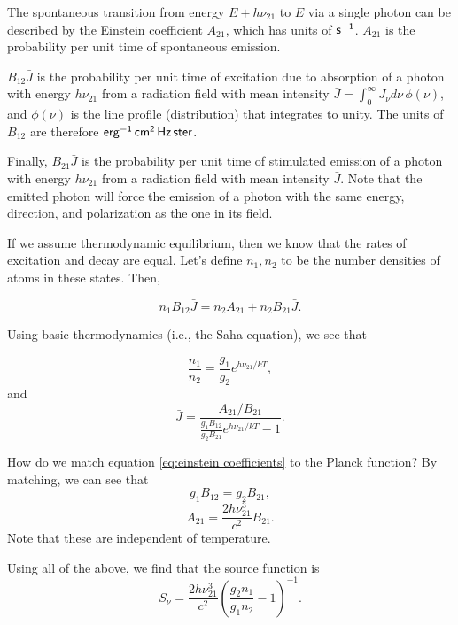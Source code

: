 \documentclass{tufte-handout}
\renewcommand{\rm}{\sf}
\begin{document}
The spontaneous transition from energy $E + h\nu_{21}$ to $E$ via a single photon can be described by the Einstein coefficient $A_{21}$, which has units of $\rm s^{-1}$. $A_{21}$ is the probability per unit time of spontaneous emission.

$B_{12} \bar J$ is the probability per unit time of excitation due to absorption of a photon with energy $h\nu_{21}$ from a radiation field with mean intensity $\bar J = \int_0^\infty J_\nu d\nu \, \phi(\nu)$, and $\phi(\nu)$ is the line profile (distribution) that integrates to unity. The units of $B_{12}$ are therefore $\rm erg^{-1}\, cm^2 \, Hz\, ster$.

Finally, $B_{21} \bar J$ is the probability per unit time of stimulated emission of a photon with energy $h \nu_{21}$ from a radiation field with mean intensity $\bar J$. Note that the emitted photon will force the emission of a photon with the same energy, direction, and polarization as the one in its field.

If we assume thermodynamic equilibrium, then we know that the rates of excitation and decay are equal. Let's define $n_1, n_2$ to be the number densities of atoms in these states. Then,

\begin{equation}
n_1 B_{12} \bar J = n_2 A_{21} + n_2 B_{21} \bar J.
\end{equation}

Using basic thermodynamics (i.e., the Saha equation), we see that

\[\frac{n_1}{n_2} = \frac{g_1}{g_2}e^{h\nu_{21}/kT},\]
and 
\begin{equation} \label{eq:einstein coefficients}
\bar J = \frac{A_{21} / B_{21}}{\frac{g_1 B_{12}}{g_2 B_{21}} e^{h\nu_{21}/kT} - 1}.
\end{equation}

How do we match equation \eqref{eq:einstein coefficients} to the Planck function? By matching, we can see that 
\[g_1 B_{12} = g_2 B_{21}, \]
\[A_{21} = \frac{2h \nu_{21}^3}{c^2} B_{21}. \]
Note that these are independent of temperature.

Using all of the above, we find that the source function is
\begin{equation}
S_\nu = \frac{2h \nu_{21}^3}{c^2} \left (\frac{g_2 n_1}{g_1 n_2} -1\right )^{-1}.
\end{equation}
\end{document}

